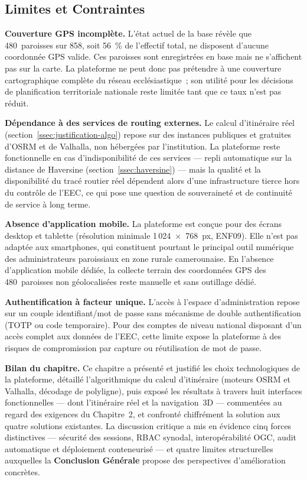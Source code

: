\documentclass[12pt, a4paper]{report}
\begin{document}
\subsection{Limites et Contraintes}
\label{ssec:disc-limites}

\textbf{Couverture GPS incomplète.}
L'état actuel de la base révèle que 480~paroisses sur 858, soit
56~\% de l'effectif total, ne disposent d'aucune coordonnée GPS valide.
Ces paroisses sont enregistrées en base mais ne s'affichent pas sur la
carte. La plateforme ne peut donc
pas prétendre à une couverture cartographique complète du réseau
ecclésiastique~; son utilité pour les décisions de planification
territoriale nationale reste limitée tant que ce taux n'est pas réduit.

\textbf{Dépendance à des services de routing externes.}
Le calcul d'itinéraire réel (section~\ref{ssec:justification-algo}) repose
sur des instances publiques et gratuites d'OSRM et de Valhalla, non
hébergées par l'institution. La plateforme reste fonctionnelle en cas
d'indisponibilité de ces services --- repli automatique sur la distance de
Haversine (section~\ref{ssec:haversine}) --- mais la qualité et la
disponibilité du tracé routier réel dépendent alors d'une infrastructure
tierce hors du contrôle de l'EEC, ce qui pose une question de souveraineté
et de continuité de service à long terme.

\textbf{Absence d'application mobile.}
La plateforme est conçue pour des écrans desktop et tablette
(résolution minimale 1\,024~$\times$~768~px, ENF09). Elle n'est pas
adaptée aux smartphones, qui constituent pourtant le principal outil
numérique des administrateurs paroissiaux en zone rurale camerounaise.
En l'absence d'application mobile dédiée, la collecte terrain des
coordonnées GPS des 480~paroisses non géolocalisées reste manuelle et
sans outillage dédié.

\textbf{Authentification à facteur unique.}
L'accès à l'espace d'administration repose sur un couple identifiant/mot
de passe sans mécanisme de double authentification (TOTP ou code
temporaire). Pour des comptes de niveau national disposant d'un accès
complet aux données de l'EEC, cette limite expose la plateforme à des
risques de compromission par capture ou réutilisation de mot de passe.

\medskip
\noindent\textbf{Bilan du chapitre.}
Ce chapitre a présenté et justifié les choix technologiques de la
plateforme, détaillé l'algorithmique du calcul d'itinéraire (moteurs OSRM et
Valhalla, décodage de polyligne), puis exposé les résultats à travers huit
interfaces fonctionnelles --- dont l'itinéraire réel et la navigation~3D ---
commentées au regard des exigences du Chapitre~2, et confronté chiffrément la
solution aux quatre solutions existantes. La discussion critique a
mis en évidence cinq forces distinctives --- sécurité des sessions, RBAC
synodal, interopérabilité OGC, audit automatique et déploiement conteneurisé
--- et quatre limites structurelles auxquelles la \textbf{Conclusion
Générale} propose des perspectives d'amélioration concrètes.
\end{document}
